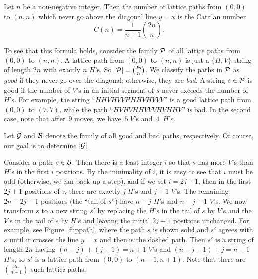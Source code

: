 \begin{example}

Let $n$ be a non-negative integer.  Then the number of lattice
paths from $(0,0)$ to $(n,n)$ which never go above the diagonal
line $y=x$ is the Catalan number 
\[
C(n) =\frac{1}{n+1}\binom{2n}{n}.
\]

To see that this formula holds, consider the family $\mathcal{P}$ of all
lattice paths from $(0,0)$ to $(n,n)$.  A lattice path from $(0,0)$ to
$(n,n)$ is just a $\{H,V\}$-string of length $2n$ with exactly $n$
$H$'s.  So $|\mathcal{P}|=\binom{2n}{n}$.  We classify the paths in $\mathcal{P}$ as
\textit{good} if they never go over the diagonal; otherwise, they are
\textit{bad}.  A string $s\in\mathcal{P}$ is good if the number of $V$'s in
an initial segment of $s$ never exceeds the number of $H$'s.  For
example, the string ``$HHVHVVHHHVHVVV$'' is a good lattice path from
$(0,0)$ to $(7,7)$, while the path ``$HVHVHHVVVHVHHV$'' is bad.  In
the second case, note that after~$9$ moves, we have~$5$ $V$'s
and~$4$~$H$'s.

Let $\mathcal{G}$ and $\mathcal{B}$ denote the family of all good and bad paths,
respectively.  Of course, our goal is to determine $|\mathcal{G}|$.

Consider a path $s\in\mathcal{B}$. Then there is a least integer $i$ so that
$s$ has more $V$'s than $H$'s in the first $i$ positions. By the
minimality of $i$, it is easy to see that $i$ must be odd (otherwise,
we can back up a step), and if we set $i=2j+1$, then in the first
$2j+1$ positions of $s$, there are exactly $j$ $H$'s and $j+1$
$V$'s. The remaining $2n-2j-1$ positions (the ``tail of $s$'') have
$n-j$ $H$'s and $n-j-1$ $V$'s. We now transform $s$ to a new string
$s'$ by replacing the $H$'s in the tail of $s$ by $V$'s and the $V$'s
in the tail of $s$ by $H$'s and leaving the initial $2j+1$ positions
unchanged. For example, see Figure~\ref{flippath}, where the path $s$
is shown solid and $s'$ agrees with $s$ until it crosses the line
$y=x$ and then is the dashed path. Then $s'$ is a string of length
$2n$ having $(n-j)+(j+1) = n+1$ $V$'s and $(n-j-1)+j=n-1$ $H$'s, so
$s'$ is a lattice path from $(0,0)$ to $(n-1,n+1)$. Note that there
are $\binom{2n}{n-1}$ such lattice paths.


\end{example}
